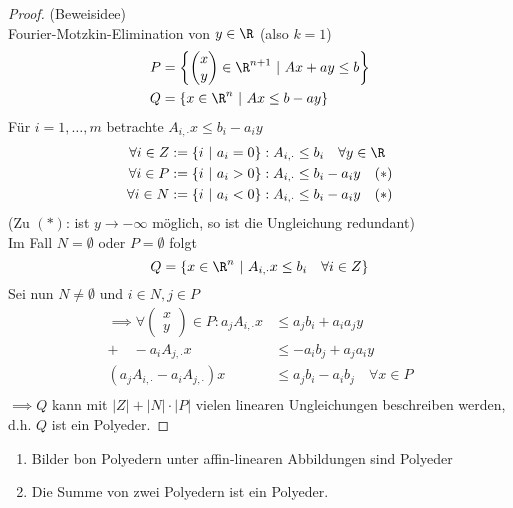 \begin{proof}
	(Beweisidee)\\
	Fourier-Motzkin-Elimination von $y \in \R$ (also $k=1$)
	\begin{align*}
		P &= \left\{ 
			\begin{pmatrix}
				x\\y
			\end{pmatrix}
			\in \R^{n+1}\ |\ Ax + ay \leq b
			\right\}\\
		Q &= \left\{ x \in \R^{n}\ |\ Ax  \leq b - ay \right\}
	\end{align*}
	Für $i=1,\dots ,m$ betrachte $A_{i,\cdot}x \leq b_{i} -a_{i}y$
	\begin{align*}
		\forall i \in Z := \left\{ i \ |\ a_{i} = 0 \right\} &: A_{i,\cdot} \leq b_{i} \quad \forall y \in \R\\
		\forall i \in P := \left\{ i \ |\ a_{i} > 0 \right\} &: A_{i,\cdot} \leq b_{i} - a_{i}y \quad(*)\\
		\forall i \in N := \left\{ i \ |\ a_{i} < 0 \right\} &: A_{i,\cdot} \leq b_{i} - a_{i}y \quad(*)\\
	\end{align*}
	(Zu $(*)$: ist $y\to - \infty$ möglich, so ist die Ungleichung redundant)\\
	Im Fall $N=\emptyset$ oder $P = \emptyset$ folgt 
	\begin{equation*}
		Q = \left\{ x \in \R^n\ |\ A_{i,\cdot} x \leq b_{i} \quad \forall i \in Z \right\}
	\end{equation*}
	Sei nun $N \neq \emptyset$ und $i \in N, j \in P$ 
	\begin{align*}
		\implies \forall 
		\begin{pmatrix}
			x\\y
		\end{pmatrix}
		\in P : a_{j}A_{i,\cdot}x &\leq a_{j}b_{i} + a_{i}a_{j}y\\
		 + \quad -a_{i}A_{j,\cdot}x &\leq -a_{i}b_{j} + a_{j}a_{i}y\\ \hline
		 (a_{j}A_{i,\cdot}-a_{i}A_{j,\cdot})x &\leq a_{j}b_{i} - a_{i}b_{j} \quad \forall x \in P\\
	\end{align*}
	$\implies Q$ kann mit $|Z| + |N|\cdot |P|$ vielen linearen Ungleichungen beschreiben werden, d.h. $Q$ ist ein Polyeder.
\end{proof}
\begin{lemma}
	\begin{enumerate}[label = (\alph*)]
		\item Bilder bon Polyedern unter affin-linearen Abbildungen sind Polyeder
		\item Die Summe von zwei Polyedern ist ein Polyeder.
	\end{enumerate}
\end{lemma}
